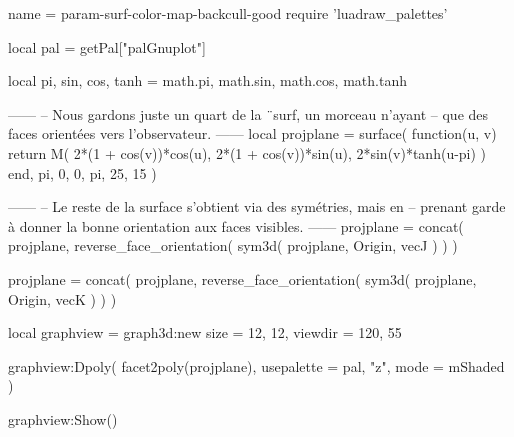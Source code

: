 \documentclass{standalone}
\begin{document}
\begin{luadraw}{name = param-surf-color-map-backcull-good}
require 'luadraw_palettes'

local pal = getPal["palGnuplot"]

local pi, sin, cos, tanh = math.pi, math.sin, math.cos, math.tanh

------
-- Nous gardons juste un quart de la ¨surf, un morceau n'ayant
-- que des faces orientées vers l'observateur.
------
local projplane = surface(
  function(u, v)
    return M(
      2*(1 + cos(v))*cos(u),
      2*(1 + cos(v))*sin(u),
      2*sin(v)*tanh(u-pi)
    )
  end,
  pi, 0, 0, pi,
  {25, 15}
)

------
-- Le reste de la surface s'obtient via des symétries, mais en
-- prenant garde à donner la bonne orientation aux faces visibles.
------
projplane = concat(
  projplane,
  reverse_face_orientation(
    sym3d(
      projplane,
      {Origin, vecJ}
    )
  )
)

projplane = concat(
  projplane,
  reverse_face_orientation(
    sym3d(
      projplane,
      {Origin, vecK}
    )
  )
)

local graphview = graph3d:new{
  size    = {12, 12},
  viewdir = {120, 55}
}

graphview:Dpoly(
  facet2poly(projplane), 
  {
    usepalette = {pal, "z"},
    mode       = mShaded
  }
)

graphview:Show()
\end{luadraw}
\end{document}
